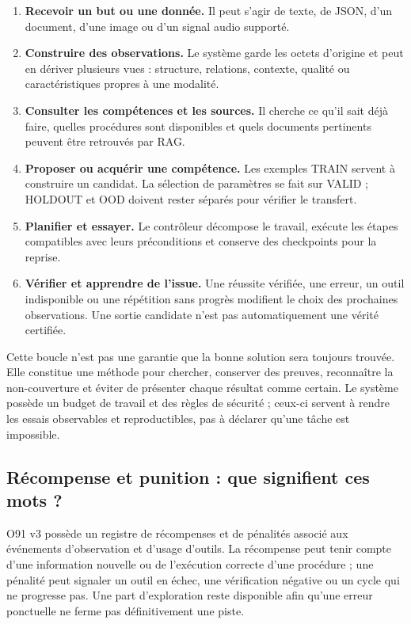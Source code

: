 \documentclass[11pt,a4paper]{article}
\begin{document}
\begin{enumerate}
\item \textbf{Recevoir un but ou une donnée.} Il peut s'agir de texte, de JSON, d'un document, d'une image ou d'un signal audio supporté.
\item \textbf{Construire des observations.} Le système garde les octets d'origine et peut en dériver plusieurs vues : structure, relations, contexte, qualité ou caractéristiques propres à une modalité.
\item \textbf{Consulter les compétences et les sources.} Il cherche ce qu'il sait déjà faire, quelles procédures sont disponibles et quels documents pertinents peuvent être retrouvés par RAG.
\item \textbf{Proposer ou acquérir une compétence.} Les exemples TRAIN servent à construire un candidat. La sélection de paramètres se fait sur VALID ; HOLDOUT et OOD doivent rester séparés pour vérifier le transfert.
\item \textbf{Planifier et essayer.} Le contrôleur décompose le travail, exécute les étapes compatibles avec leurs préconditions et conserve des checkpoints pour la reprise.
\item \textbf{Vérifier et apprendre de l'issue.} Une réussite vérifiée, une erreur, un outil indisponible ou une répétition sans progrès modifient le choix des prochaines observations. Une sortie candidate n'est pas automatiquement une vérité certifiée.
\end{enumerate}

Cette boucle n'est pas une garantie que la bonne solution sera toujours trouvée. Elle constitue une méthode pour chercher, conserver des preuves, reconnaître la non-couverture et éviter de présenter chaque résultat comme certain. Le système possède un budget de travail et des règles de sécurité ; ceux-ci servent à rendre les essais observables et reproductibles, pas à déclarer qu'une tâche est impossible.

\subsection*{Récompense et punition : que signifient ces mots ?}

O91 v3 possède un registre de récompenses et de pénalités associé aux événements d'observation et d'usage d'outils. La récompense peut tenir compte d'une information nouvelle ou de l'exécution correcte d'une procédure ; une pénalité peut signaler un outil en échec, une vérification négative ou un cycle qui ne progresse pas. Une part d'exploration reste disponible afin qu'une erreur ponctuelle ne ferme pas définitivement une piste.
\end{document}
